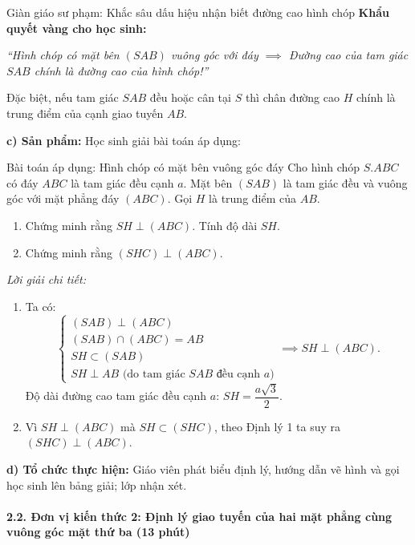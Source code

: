 \documentclass[12pt, a4paper]{article}
\begin{document}
\begin{scaffoldbox}{Giàn giáo sư phạm: Khắc sâu dấu hiệu nhận biết đường cao hình chóp}
\textbf{Khẩu quyết vàng cho học sinh:}
\begin{center}
\textit{``Hình chóp có mặt bên $(SAB)$ vuông góc với đáy $\implies$ Đường cao của tam giác $SAB$ chính là đường cao của hình chóp!''}
\end{center}
Đặc biệt, nếu tam giác $SAB$ đều hoặc cân tại $S$ thì chân đường cao $H$ chính là trung điểm của cạnh giao tuyến $AB$.
\end{scaffoldbox}

\noindent \textbf{c) Sản phẩm:}
Học sinh giải bài toán áp dụng:
\begin{pedabox}{Bài toán áp dụng: Hình chóp có mặt bên vuông góc đáy}
Cho hình chóp $S.ABC$ có đáy $ABC$ là tam giác đều cạnh $a$. Mặt bên $(SAB)$ là tam giác đều và vuông góc với mặt phẳng đáy $(ABC)$. Gọi $H$ là trung điểm của $AB$.
\begin{enumerate}[leftmargin=0.6cm]
    \item Chứng minh rằng $SH \perp (ABC)$. Tính độ dài $SH$.
    \item Chứng minh rằng $(SHC) \perp (ABC)$.
\end{enumerate}
\end{pedabox}
\textit{Lời giải chi tiết:}
\begin{enumerate}[leftmargin=0.6cm]
    \item Ta có:
    $$\begin{cases} (SAB) \perp (ABC) \\ (SAB) \cap (ABC) = AB \\ SH \subset (SAB) \\ SH \perp AB\text{ (do tam giác } SAB \text{ đều cạnh } a) \end{cases} \implies SH \perp (ABC).$$
    Độ dài đường cao tam giác đều cạnh $a$: $SH = \dfrac{a\sqrt{3}}{2}$.
    \item Vì $SH \perp (ABC)$ mà $SH \subset (SHC)$, theo Định lý 1 ta suy ra $(SHC) \perp (ABC)$.
\end{enumerate}

\noindent \textbf{d) Tổ chức thực hiện:}
Giáo viên phát biểu định lý, hướng dẫn vẽ hình và gọi học sinh lên bảng giải; lớp nhận xét.

\paragraph{2.2. Đơn vị kiến thức 2: Định lý giao tuyến của hai mặt phẳng cùng vuông góc mặt thứ ba (13 phút)}
\end{document}
